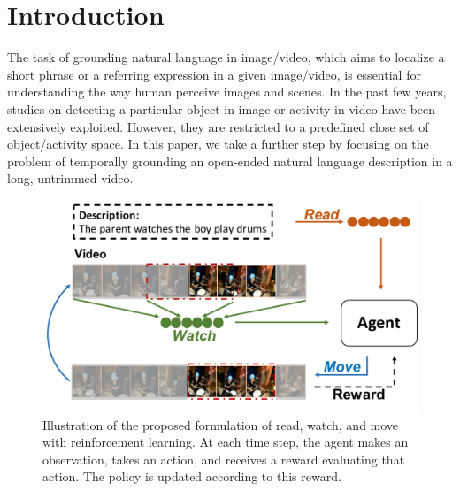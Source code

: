 \documentclass[letterpaper]{article} %
\begin{document}
\section{Introduction}
The task of grounding natural language in image/video, which aims to localize a short phrase \cite{rohrbach2016grounding,endo2017attention,tellex2009towards,regneri2013grounding} or a referring expression \cite{bojanowski2015weakly,gao2016acd} in a given image/video, is essential for understanding the way human perceive images and scenes. In the past few years, studies on detecting a particular object in image \cite{Pirinen_2018_CVPR} or activity in video \cite{lifeifei_loc,localization_multi_stream,ssn,cdc} have been extensively exploited. However, they are restricted to a predefined close set of object/activity space. In this paper, we take a further step by focusing on the problem of temporally grounding an open-ended natural language description in a long, untrimmed video.

\begin{figure}[!t]
\centering
\includegraphics[width=\columnwidth]{./fig1.pdf}
\caption{Illustration of the proposed formulation of read, watch, and move with reinforcement learning.
At each time step, the agent makes an observation, takes an action, and receives a reward evaluating that action. The policy is updated according to this reward.}
\label{fig:example}
\end{figure}
\end{document}
